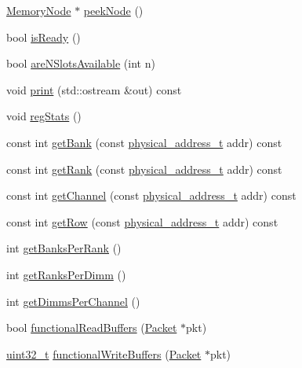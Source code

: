 \begin{DoxyCompactItemize}
\item 
\hyperlink{classMemoryNode}{MemoryNode} $\ast$ \hyperlink{classRubyMemoryControl_a8ffbfb520369710755a1260b8451de3d}{peekNode} ()
\item 
bool \hyperlink{classRubyMemoryControl_acbed040576a7a18e2d9c46b2f15e0162}{isReady} ()
\item 
bool \hyperlink{classRubyMemoryControl_a99a0d76f7266570912e6b0901cfaf9cf}{areNSlotsAvailable} (int n)
\item 
void \hyperlink{classRubyMemoryControl_ac55fe386a101fbae38c716067c9966a0}{print} (std::ostream \&out) const 
\item 
void \hyperlink{classRubyMemoryControl_a4dc637449366fcdfc4e764cdf12d9b11}{regStats} ()
\item 
const int \hyperlink{classRubyMemoryControl_a26f571eb9a81a077295b54c2ed398aea}{getBank} (const \hyperlink{TypeDefines_8hh_a7901e1a365850c5ff38ec6e12b6b9ffc}{physical\_\-address\_\-t} addr) const 
\item 
const int \hyperlink{classRubyMemoryControl_af8c39d7c9853a48fd242bda859e76222}{getRank} (const \hyperlink{TypeDefines_8hh_a7901e1a365850c5ff38ec6e12b6b9ffc}{physical\_\-address\_\-t} addr) const 
\item 
const int \hyperlink{classRubyMemoryControl_a08f255b8eb3b262916a47fa8f7c12e63}{getChannel} (const \hyperlink{TypeDefines_8hh_a7901e1a365850c5ff38ec6e12b6b9ffc}{physical\_\-address\_\-t} addr) const 
\item 
const int \hyperlink{classRubyMemoryControl_a65314c26cf3c85d8c911524ede56456c}{getRow} (const \hyperlink{TypeDefines_8hh_a7901e1a365850c5ff38ec6e12b6b9ffc}{physical\_\-address\_\-t} addr) const 
\item 
int \hyperlink{classRubyMemoryControl_aba6f6d5c066193ae70ee43153051055b}{getBanksPerRank} ()
\item 
int \hyperlink{classRubyMemoryControl_a6dff017ebfbd9d5b021b86437ff67acc}{getRanksPerDimm} ()
\item 
int \hyperlink{classRubyMemoryControl_a5a9c0e20c20d0171bb8d8a96cb22576f}{getDimmsPerChannel} ()
\item 
bool \hyperlink{classRubyMemoryControl_a898941f27bcf3a1c0383de5988406650}{functionalReadBuffers} (\hyperlink{classPacket}{Packet} $\ast$pkt)
\item 
\hyperlink{Type_8hh_a435d1572bf3f880d55459d9805097f62}{uint32\_\-t} \hyperlink{classRubyMemoryControl_a08f04f912fb872935cb2d40f8570c340}{functionalWriteBuffers} (\hyperlink{classPacket}{Packet} $\ast$pkt)
\end{DoxyCompactItemize}
